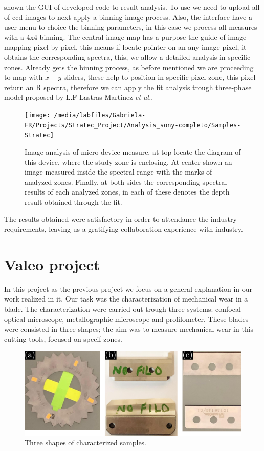  shown the GUI of developed code to result analysis. To use we need to upload all of \gls{ccd} images to next apply a binning image process. Also, the interface have a user menu to choice the binning parameters, in this case we process all measures with a 4x4 binning. The central image map has a purpose the guide of image mapping pixel by pixel, this means if locate pointer on  an any image  pixel,  it obtains the corresponding spectra, this, we allow a detailed analysis in specific zones. Already gets the binning process, as before mentioned we are proceeding to map with $x-y$ sliders, these help to position in specific pixel zone, this pixel return an R spectra, therefore we can apply the fit analysis trough three-phase model proposed by L.F Lastras Mart\'inez \textit{et al.}\cite{lastras2017optical}. 
\begin{figure}[hbtp!]
    \centering
    \texttt{[image: /media/labfiles/Gabriela-FR/Projects/Stratec\_Project/Analysis\_sony-completo/Samples-Stratec]}
    \caption{Image analysis of micro-device measure, at top locate the diagram of this device, where the  study zone is enclosing. At center shown an image measured inside the spectral range with the marks of analyzed zones. Finally, at both sides the corresponding spectral results of each analyzed zones, in each of these denotes the depth result obtained through the fit.}
\end{figure}



The results obtained were satisfactory in order to attendance the industry requirements, leaving us a  gratifying  collaboration  experience with industry. 

\section{Valeo project}
\vspace{-1cm}
In this project as the previous project we focus on a general explanation in our work realized in it. Our task was the characterization of mechanical wear in a blade. The characterization were carried out trough three systems: confocal optical microscope, metallographic microscope and profilometer. These blades were consisted in three shapes; the aim was to measure mechanical wear in this cutting tools, focused on specif zones. 

\begin{figure}[hbtp!]
    \centering
    \includegraphics[width=\textwidth]{FIGURES/Anexo-CuSn/apendix3-0.pdf}
    \caption{Three shapes of characterized samples.}
\end{figure}